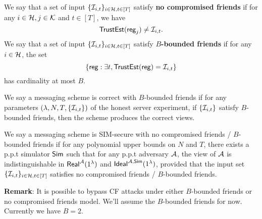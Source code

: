 

\begin{definition}
We say that a set of input $\{\mathcal{I}_{i, t}\}_{i \in \mathcal{H}, t \in [T]}$ satisfy \textbf{no compromised friends} if for any $i \in \mathcal{H}, j \in \mathcal{K}$ and $t \in [T]$, we have
$$\mathsf{TrustEst}(\mathsf{reg}_j) \neq \mathcal{I}_{i, t}.$$
We say that a set of input $\{\mathcal{I}_{i, t}\}_{i \in \mathcal{H}, t \in [T]}$ satisfy \textbf{$B$-bounded friends} if for any $i \in \mathcal{H}$, the set
$$\{\mathsf{reg}: \exists t, \mathsf{TrustEst}(\mathsf{reg}) = \mathcal{I}_{i, t}\}$$
has cardinality at most $B$.

We say a messaging scheme is correct with $B$-bounded friends if for any parameters $(\lambda, N, T, \{\mathcal{I}_{i, t}\})$ of the honest server experiment, if $\{\mathcal{I}_{i, t}\}$ satisfy $B$-bounded friends, then the scheme produces the correct views.

We say a messaging scheme is SIM-secure with no compromised friends / $B$-bounded friends if for any polynomial upper bounds on $N$ and $T$, there exists a p.p.t simulator $\mathsf{Sim}$ such that for any p.p.t adversary $\mathcal{A}$, the view of $\mathcal{A}$ is indistinguishable in $\mathsf{Real}^{\mathcal{A}}(1^{\lambda})$ and $\mathsf{Ideal}^{\mathcal{A}, \mathsf{\mathsf{Sim}}}(1^{\lambda})$, provided that the input set $\{\mathcal{I}_{i, t}\}_{i \in \mathcal{H}, t \in [T]}$ satisfies no compromised friends / $B$-bounded friends.
\end{definition}
\textbf{Remark}: It is possible to bypass CF attacks under either $B$-bounded friends or no compromised friends model. We'll assume the $B$-bounded friends for now. Currently we have $B = 2$.
